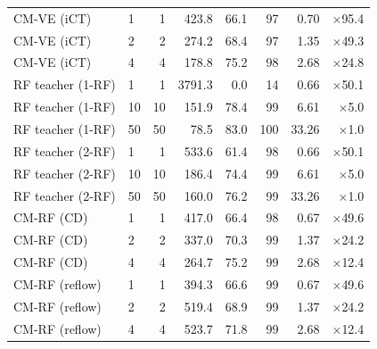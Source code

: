 \documentclass{article}
\begin{document}
\begin{table}[!htbp]
\begin{tabular}{llrrrrrr}
    \midrule
    CM-VE (iCT) & 1 & 1 & 423.8 & 66.1 & 97 & 0.70 & $\times$95.4 \\
    CM-VE (iCT) & 2 & 2 & 274.2 & 68.4 & 97 & 1.35 & $\times$49.3 \\
    CM-VE (iCT) & 4 & 4 & 178.8 & 75.2 & 98 & 2.68 & $\times$24.8 \\
    \midrule
    RF teacher (1-RF) & 1 & 1 & 3791.3 & 0.0 & 14 & 0.66 & $\times$50.1 \\
    RF teacher (1-RF) & 10 & 10 & 151.9 & 78.4 & 99 & 6.61 & $\times$5.0 \\
    RF teacher (1-RF) & 50 & 50 & 78.5 & 83.0 & 100 & 33.26 & $\times$1.0 \\
    RF teacher (2-RF) & 1 & 1 & 533.6 & 61.4 & 98 & 0.66 & $\times$50.1 \\
    RF teacher (2-RF) & 10 & 10 & 186.4 & 74.4 & 99 & 6.61 & $\times$5.0 \\
    RF teacher (2-RF) & 50 & 50 & 160.0 & 76.2 & 99 & 33.26 & $\times$1.0 \\
    \midrule
    CM-RF (CD) & 1 & 1 & 417.0 & 66.4 & 98 & 0.67 & $\times$49.6 \\
    CM-RF (CD) & 2 & 2 & 337.0 & 70.3 & 99 & 1.37 & $\times$24.2 \\
    CM-RF (CD) & 4 & 4 & 264.7 & 75.2 & 99 & 2.68 & $\times$12.4 \\
    \midrule
    CM-RF (reflow) & 1 & 1 & 394.3 & 66.6 & 99 & 0.67 & $\times$49.6 \\
    CM-RF (reflow) & 2 & 2 & 519.4 & 68.9 & 99 & 1.37 & $\times$24.2 \\
    CM-RF (reflow) & 4 & 4 & 523.7 & 71.8 & 99 & 2.68 & $\times$12.4 \\
    \bottomrule
  \end{tabular}
\end{table}
\end{document}
